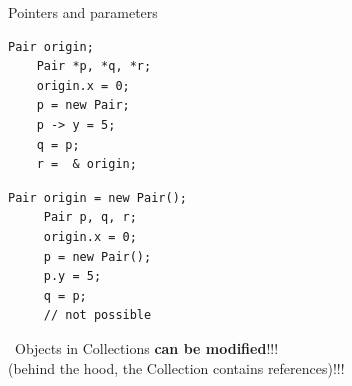 \documentclass[English,c,%
hyperref={%
    pdftitle={FISA-DE2 OOP in Java},%
    pdfauthor={Muller, Gravier, Laforest, Subercaze},%
    pdfsubject={OOP in Java},%
    pdfkeywords={OOP, Java},%
    colorlinks=true,%
    urlcolor=blue,%
    linkcolor=%
    },%
xcolor={pdftex,svgnames} %
]{beamer}
\begin{document}
\begin{frame}[fragile]{Pointers and parameters}

\begin{minipage}[l]{.45\textwidth}
  \begin{lstlisting}[escapechar=\%,label=inCpp,caption=MyCode.cpp]
    Pair origin;
    Pair *p, *q, *r;
    origin.x = 0;
    p = new Pair;
    p -> y = 5;
    q = p;
    r =  & origin;
   \end{lstlisting}
 \end{minipage}
 \begin{minipage}[l]{.45\textwidth}
   \begin{lstlisting}[escapechar=\%,label=inJava,caption=MyCode.java]
     Pair origin = new Pair();
     Pair p, q, r;
     origin.x = 0;
     p = new Pair();
     p.y = 5;
     q = p;
     // not possible
   \end{lstlisting}
 \end{minipage}

\bigskip
\bigskip

\danger{}~Objects in Collections \textbf{can be modified}!!! \\
(behind the hood, the Collection contains references)!!!

\end{frame}
\end{document}
